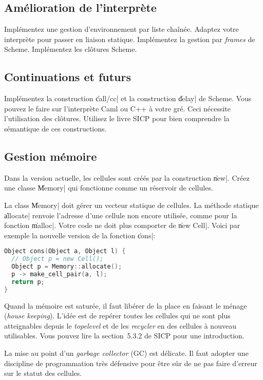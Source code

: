 \documentclass{../../../LaTeX/tdsimple}
\begin{document}
\subsection{Amélioration de l'interprète \protect{}}

Implémentez une gestion d'environnement par liste chaînée. Adaptez
votre interprète pour passer en liaison statique. Implémentez la
gestion par \emph{frames} de Scheme.  Implémentez les clôtures Scheme.

\subsection{Continuations et futurs \protect{}}

Implémentez la construction \|call/cc| et la construction \|delay| de
Scheme. Vous pouvez le faire sur l'interprète Caml ou C++ à votre
gré. Ceci nécessite l'utilisation des clôtures. Utilisez le livre SICP
pour bien comprendre la sémantique de ces constructions.

\subsection{Gestion mémoire \protect{}}

Dans la version actuelle, les cellules sont créés par la construction
\|new|. Créez une classe \|Memory| qui fonctionne comme un réservoir
de cellules.
\begin{attention}
  La class \|Memory| doit gérer un vecteur statique de cellules.  La
  méthode statique \|allocate| renvoie l'adresse d'une cellule non
  encore utilisée, comme pour la fonction \|malloc|. Votre code ne
  doit plus comporter de \|new Cell|. Voici par exemple la nouvelle
  version de la fonction \|cons|:
\begin{lstlisting}[language=c++]
Object cons(Object a, Object l) {
  // Object p = new Cell();
  Object p = Memory::allocate();
  p -> make_cell_pair(a, l);
  return p;
}
\end{lstlisting}
\end{attention}

Quand la mémoire est saturée, il faut libérer de la place en faisant
le ménage (\emph{house keeping}). L'idée est de repérer toutes les
cellules qui ne sont plus atteignables depuis le \emph{topelevel} et de
les \emph{recycler} en des cellules à nouveau utilisables. Vous pouvez lire
la section~5.3.2 de SICP pour une introduction. 
\begin{attention}
  La mise au point d'un \emph{garbage collector} (GC) est 
  délicate. Il faut adopter une discipline de programmation très
  défensive pour être sûr de ne pas faire d'erreur sur le statut des cellules.
\end{attention}
\end{document}
